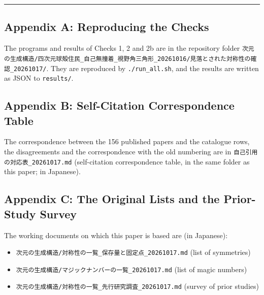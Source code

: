\documentclass[
  a4paper,
]{article}
\providecommand{\tightlist}{%
  \setlength{\itemsep}{0pt}\setlength{\parskip}{0pt}}
\begin{document}
\begin{center}\rule{0.5\linewidth}{0.5pt}\end{center}

\subsection{Appendix A: Reproducing the
Checks}\label{appendix-a-reproducing-the-checks}

The programs and results of Checks 1, 2 and 2b are in the repository
folder
\texttt{次元の生成構造/\allowbreak{}四次元球殻住民\_\allowbreak{}自己無撞着\_\allowbreak{}視野角三角形\_\allowbreak{}20261016/\allowbreak{}見落とされた対称性の確認\_\allowbreak{}20261017/\allowbreak{}}.
They are reproduced by \texttt{./\allowbreak{}run\_\allowbreak{}all.sh}, and the results are
written as JSON to \texttt{results/\allowbreak{}}.

\subsection{Appendix B: Self-Citation Correspondence
Table}\label{appendix-b-self-citation-correspondence-table}

The correspondence between the 156 published papers and the catalogue
rows, the disagreements and the correspondence with the old numbering
are in \texttt{自己引用の対応表\_\allowbreak{}20261017.md} (self-citation
correspondence table, in the same folder as this paper; in Japanese).

\subsection{Appendix C: The Original Lists and the Prior-Study
Survey}\label{appendix-c-the-original-lists-and-the-prior-study-survey}

The working documents on which this paper is based are (in Japanese):

\begin{itemize}
\tightlist
\item
  \texttt{次元の生成構造/\allowbreak{}対称性の一覧\_\allowbreak{}保存量と固定点\_\allowbreak{}20261017.md}
  (list of symmetries)
\item
  \texttt{次元の生成構造/\allowbreak{}マジックナンバーの一覧\_\allowbreak{}20261017.md} (list of
  magic numbers)
\item
  \texttt{次元の生成構造/\allowbreak{}対称性の一覧\_\allowbreak{}先行研究調査\_\allowbreak{}20261017.md}
  (survey of prior studies)
\end{itemize}
\end{document}
